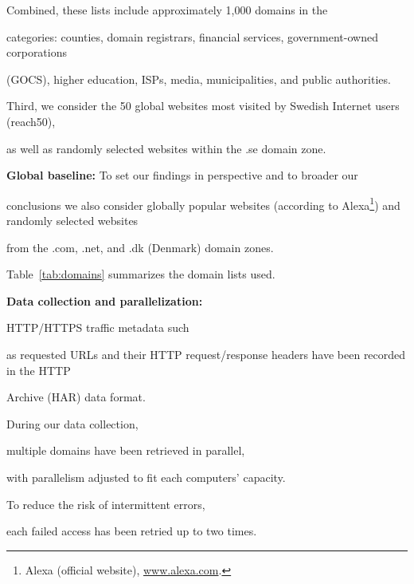 \documentclass{sig-alternate-10pt}
\begin{document}
Combined, these lists include approximately 1,000 domains in the

categories: counties, domain registrars, financial services, government-owned corporations

(GOCS), higher education, ISPs, media, municipalities, and public authorities.

Third, we consider the 50 global websites most visited by Swedish Internet users (reach50),

as well as randomly selected websites within the .se domain zone.



{\bf Global baseline:}  To set our findings in perspective and to broader our

conclusions we also consider globally popular websites (according to Alexa\footnote{

Alexa (official website), \url{www.alexa.com}.}) and randomly selected websites 

from the .com, .net, and .dk (Denmark) domain zones.

Table~\ref{tab:domains} summarizes the domain lists used.






{\bf Data collection and parallelization:}

HTTP/HTTPS traffic metadata such

as requested URLs and their HTTP request/response headers have been recorded in the HTTP

Archive (HAR) data format.

During our data collection,

multiple domains have been retrieved in parallel, 

with parallelism adjusted to fit each computers' capacity. 

To reduce the risk of intermittent errors,


each failed access has been retried up to two times.



\end{document}
